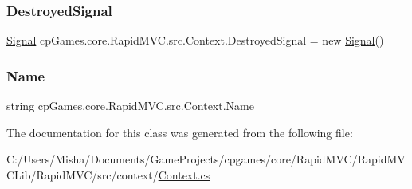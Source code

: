 \subsubsection{\texorpdfstring{DestroyedSignal}{DestroyedSignal}}
{\footnotesize\ttfamily \mbox{\hyperlink{classcp_games_1_1core_1_1_rapid_m_v_c_1_1_signal}{Signal}} cp\+Games.\+core.\+Rapid\+M\+V\+C.\+src.\+Context.\+Destroyed\+Signal = new \mbox{\hyperlink{classcp_games_1_1core_1_1_rapid_m_v_c_1_1_signal}{Signal}}()\hspace{0.3cm}{\ttfamily [get]}}

\mbox{\label{classcp_games_1_1core_1_1_rapid_m_v_c_1_1src_1_1_context_a5e2a8abd51dae0bace9004b876502809}} 
\subsubsection{\texorpdfstring{Name}{Name}}
{\footnotesize\ttfamily string cp\+Games.\+core.\+Rapid\+M\+V\+C.\+src.\+Context.\+Name\hspace{0.3cm}{\ttfamily [get]}}



The documentation for this class was generated from the following file\+:\begin{DoxyCompactItemize}
\item 
C\+:/\+Users/\+Misha/\+Documents/\+Game\+Projects/cpgames/core/\+Rapid\+M\+V\+C/\+Rapid\+M\+V\+C\+Lib/\+Rapid\+M\+V\+C/src/context/\mbox{\hyperlink{_context_8cs}{Context.\+cs}}\end{DoxyCompactItemize}
